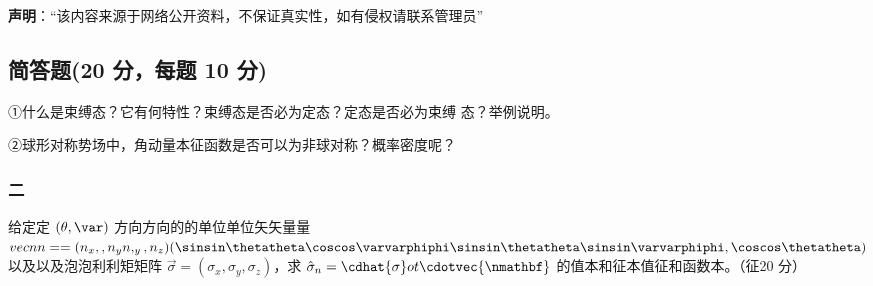 
\textbf{声明}：“该内容来源于网络公开资料，不保证真实性，如有侵权请联系管理员”

\subsection{简答题(20 分，每题 10 分)}
①什么是束缚态？它有何特性？束缚态是否必为定态？定态是否必为束缚
态？举例说明。

②球形对称势场中，角动量本征函数是否可以为非球对称？概率密度呢？

\subsubsection{二}
给定定 $(\theta, \var)$  方向方向的的单位单位矢矢量量  ${vecn{n}} = = ( n_x,, n_y n,_y, n_z) (\sinsin\thetatheta\coscos\varvarphiphi\sinsin\thetatheta \sinsin\varvarphiphi,\coscos\thetatheta)$  以及以及泡泡利利矩矩阵 $\vec{\sigma} = (\sigma_x, \sigma_y, \sigma_z)$，求 $\hat{\sigma}_n = \cdhat{\sigma}ot  \cdotvec{ \nmathbf}$ 的值本和征本值征和函数本。（征20 分）

